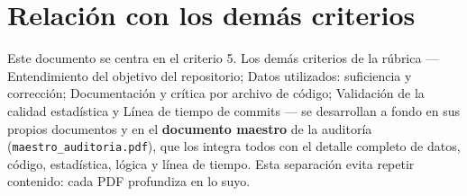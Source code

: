 \section{Relación con los demás criterios}

Este documento se centra en el criterio 5. Los demás criterios de la
rúbrica — Entendimiento del objetivo del repositorio; Datos utilizados: suficiencia y corrección; Documentación y crítica por archivo de código; Validación de la calidad estadística y Línea de tiempo de commits — se desarrollan a fondo en sus propios documentos
y en el \textbf{documento maestro} de la auditoría (\texttt{maestro\_auditoria.pdf}),
que los integra todos con el detalle completo de datos, código, estadística,
lógica y línea de tiempo. Esta separación evita repetir contenido: cada PDF
profundiza en lo suyo.
